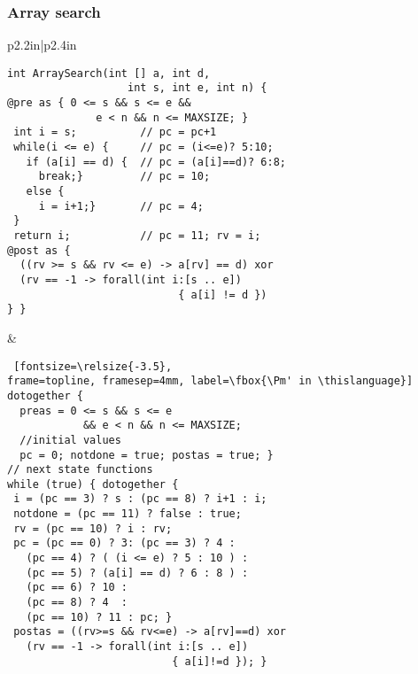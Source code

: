 \begin{frame}[containsverbatim]
\frametitle{Array search}
  \small {
  \begin{tabular}{p{2.2in}|p{2.4in}}
\begin{Verbatim}[fontsize=\relsize{-3.5}, 
frame=topline, framesep=4mm, label=\fbox{\Pm in \psqlanguage}]
int ArraySearch(int [] a, int d, 
                   int s, int e, int n) {
@pre as { 0 <= s && s <= e && 
              e < n && n <= MAXSIZE; }
 int i = s;          // pc = pc+1
 while(i <= e) {     // pc = (i<=e)? 5:10;
   if (a[i] == d) {  // pc = (a[i]==d)? 6:8;
     break;}         // pc = 10;
   else {
     i = i+1;}       // pc = 4;
 }
 return i;           // pc = 11; rv = i;
@post as {
  ((rv >= s && rv <= e) -> a[rv] == d) xor 
  (rv == -1 -> forall(int i:[s .. e]) 
                           { a[i] != d })
} }
\end{Verbatim}
& 
\begin{Verbatim} [fontsize=\relsize{-3.5},
frame=topline, framesep=4mm, label=\fbox{\Pm' in \thislanguage}]
dotogether {
  preas = 0 <= s && s <= e 
            && e < n && n <= MAXSIZE;
  //initial values
  pc = 0; notdone = true; postas = true; }
// next state functions
while (true) { dotogether {  
 i = (pc == 3) ? s : (pc == 8) ? i+1 : i;
 notdone = (pc == 11) ? false : true;
 rv = (pc == 10) ? i : rv;
 pc = (pc == 0) ? 3: (pc == 3) ? 4 : 
   (pc == 4) ? ( (i <= e) ? 5 : 10 ) :
   (pc == 5) ? (a[i] == d) ? 6 : 8 ) :
   (pc == 6) ? 10 :
   (pc == 8) ? 4  : 
   (pc == 10) ? 11 : pc; }
 postas = ((rv>=s && rv<=e) -> a[rv]==d) xor
   (rv == -1 -> forall(int i:[s .. e]) 
                          { a[i]!=d }); }
\end{Verbatim}
\end{tabular}
}
\end{frame}

